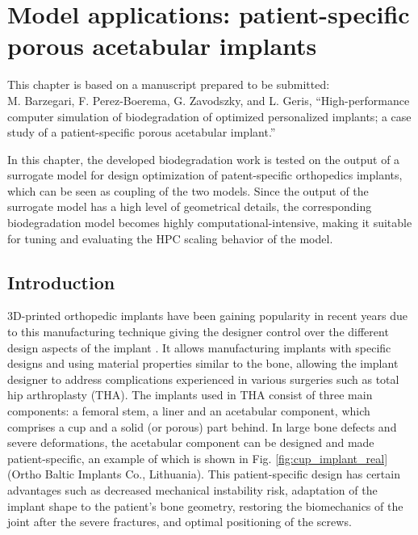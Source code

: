\chapter{Model applications: patient-specific porous acetabular implants}\label{ch:cup}

\begin{tcolorbox}
This chapter is based on a manuscript prepared to be submitted:\\
M. Barzegari, F. Perez-Boerema, G. Zavodszky, and L. Geris, ``High-performance computer simulation of biodegradation of optimized personalized implants; a case study of a patient-specific porous acetabular implant.''
\end{tcolorbox}

In this chapter, the developed biodegradation work is tested on the output of a surrogate model for design optimization of patent-specific orthopedics implants, which can be seen as coupling of the two models. Since the output of the surrogate model has a high level of geometrical details, the corresponding biodegradation model becomes highly computational-intensive, making it suitable for tuning and evaluating the HPC scaling behavior of the model.

\section{Introduction}


3D-printed orthopedic implants have been gaining popularity in recent years due to this manufacturing technique giving the designer control over the different design aspects of the implant \cite{Kumar2021,Yadav2020}. It allows manufacturing implants with specific designs and using material properties similar to the bone, allowing the implant designer to address complications experienced in various surgeries such as total hip arthroplasty (\gls{THA}). The implants used in \gls{THA} consist of three main components: a femoral stem, a liner and an acetabular component, which comprises a cup and a solid (or porous) part behind. In large bone defects and severe deformations, the acetabular component can be designed and made patient-specific, an example of which is shown in Fig. \ref{fig:cup_implant_real} (Ortho Baltic Implants Co., Lithuania). This patient-specific design has certain advantages such as decreased mechanical instability risk, adaptation of the implant shape to the patient's bone geometry, restoring the biomechanics of the joint after the severe fractures, and optimal positioning of the screws.


